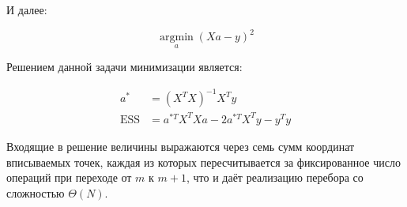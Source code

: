 \begin{frame}
	И далее:

	\begin{equation*}
		\operatorname*{argmin}_{a}\left(Xa - y \right)^2
	\end{equation*}

	Решением данной задачи минимизации является:

	\begin{align}
		a^* &= \left(X^TX\right)^{-1}X^Ty \label{eq:optimal_lsh_sol}\\
		\text{ESS} &= a^{*T}X^TXa - 2 a^{*T}X^Ty - y^Ty \label{eq:optimal_lsh_sol_mse}
	\end{align}

	Входящие в решение величины выражаются через семь сумм координат вписываемых точек, каждая из которых пересчитывается за фиксированное число операций при переходе от $m$ к $m+1$, что и даёт реализацию перебора со сложностью $\Theta(N)$.
\end{frame}

